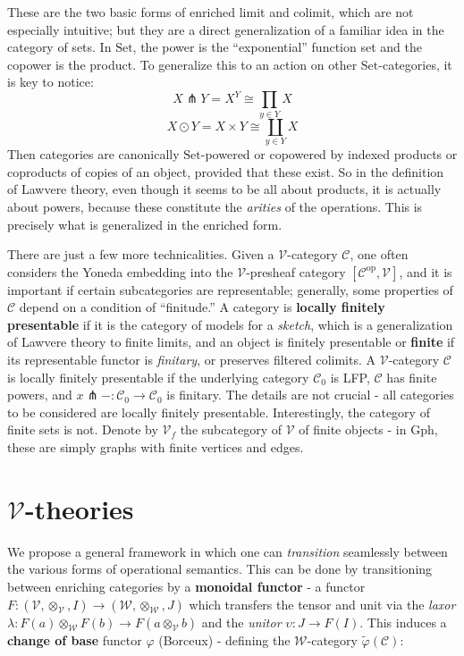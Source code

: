 \documentclass[a4paper,UKenglish]{article}
\newcommand{\Gph}{\mathrm{Gph}}
\newcommand{\Set}{\mathrm{Set}}
\newcommand{\op}{\mathrm{op}}
\newcommand{\V}{\mathscr{V}}
\newcommand{\W}{\mathscr{W}}
\newcommand{\C}{\mathscr{C}}
\newcommand{\pfk}{\pitchfork}
\begin{document}
These are the two basic forms of enriched limit and colimit, which are not especially intuitive; but they are a direct generalization of a familiar idea in the category of sets. In $\Set$, the power is the ``exponential'' function set and the copower is the product. To generalize this to an action on other $\Set$-categories, it is key to notice: $$X \pfk Y = X^Y \cong \prod_{y\in Y}X$$ $$X \odot Y = X \times Y \cong \coprod_{y\in Y}X$$ Then categories are canonically $\Set$-powered or copowered by indexed products or coproducts of copies of an object, provided that these exist. So in the definition of Lawvere theory, even though it seems to be all about products, it is actually about powers, because these constitute the \textit{arities} of the operations. This is precisely what is generalized in the enriched form.

There are just a few more technicalities. Given a $\V$-category $\C$, one often considers the Yoneda embedding into the $\V$-presheaf category $[\C^\op, \V]$, and it is important if certain subcategories are representable; generally, some properties of $\C$ depend on a condition of ``finitude.'' \cite{finite} A category is \textbf{locally finitely presentable} if it is the category of models for a \textit{sketch}, which is a generalization of Lawvere theory to finite limits, and an object is finitely presentable or \textbf{finite} if its representable functor is \textit{finitary}, or preserves filtered colimits. A $\V$-category $\C$ is locally finitely presentable if the underlying category $\C_0$ is LFP, $\C$ has finite powers, and $x\pfk -: \C_0 \to \C_0$ is finitary. The details are not crucial - all categories to be considered are locally finitely presentable. Interestingly, the category of finite sets is not. Denote by $\V_f$ the subcategory of $\V$ of finite objects - in $\Gph$, these are simply graphs with finite vertices and edges.\\

\section{$\V$-theories}
We propose a general framework in which one can \textit{transition} seamlessly between the various forms of operational semantics. This can be done by transitioning between enriching categories by a \textbf{monoidal functor} - a functor $F: (\V,\otimes_\V,I) \to (\W,\otimes_\W,J)$ which transfers the tensor and unit via the \textit{laxor} $\lambda: F(a) \otimes_\W F(b) \to F(a\otimes_\V b)$ and the \textit{unitor} $\upsilon: J \to F(I)$. This induces a \textbf{change of base} functor $\varphi$ (Borceux) - defining the $\W$-category $\widetilde{\varphi}(\C)$:
\end{document}

